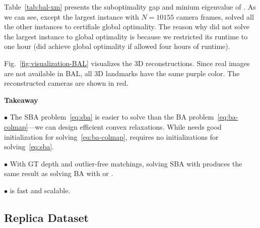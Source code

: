 Table~\ref{tab:bal-xm} presents the suboptimality gap and minium eigenvalue of \nameshort. As we can see, except the largest instance with $N=10155$ camera frames, \nameshort solved all the other instances to certifiale global optimality. The reason why \nameshort did not solve the largest instance to global optimality is because we restricted its runtime to one hour (\nameshort did achieve global optimality if allowed four hours of runtime). 

Fig.~\ref{fig:visualization-BAL} visualizes the 3D reconstructions. Since real images are not available in BAL, all 3D landmarks have the same purple color. The reconstructed cameras are shown in red.


\begin{tcolorbox}
    \begin{center}
        \vspace{-1mm}
        \textbf{Takeaway}
        \vspace{-2mm}
    \end{center} 
    $\bullet$ The SBA problem~\eqref{eq:sba} is easier to solve than the BA problem~\eqref{eq:ba-colmap}---we can design efficient convex relaxations. While \ceres needs good initialization for solving~\eqref{eq:ba-colmap}, \nameshort requires no initializations for solving~\eqref{eq:sba}.
        
    $\bullet$ With GT depth and outlier-free matchings, solving SBA with \nameshort produces the same result as solving BA with \ceres or \colmap.
       
    $\bullet$ \nameshort is fast and scalable.
\end{tcolorbox}




\subsection{Replica Dataset}\label{sec:exp-replica}

